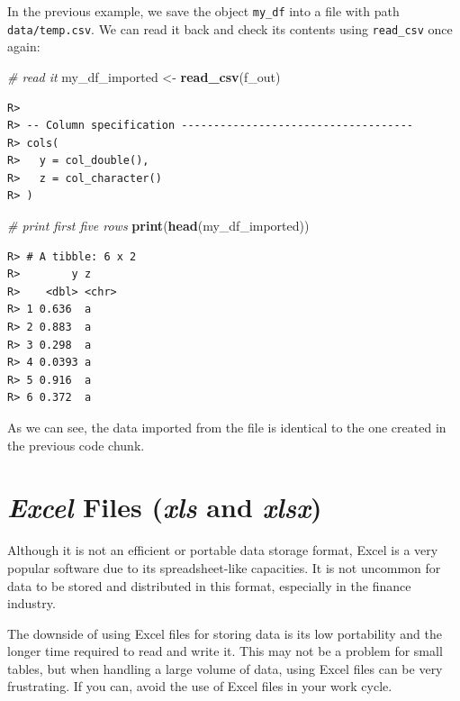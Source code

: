 \documentclass[
  12pt,
]{book}
\newenvironment{Shaded}{\begin{snugshade}}{\end{snugshade}}
\newcommand{\CommentTok}[1]{\textcolor[rgb]{0.37,0.37,0.37}{\textit{#1}}}
\newcommand{\KeywordTok}[1]{\textcolor[rgb]{0.27,0.27,0.27}{\textbf{#1}}}
\newcommand{\NormalTok}[1]{#1}
\newcommand{\StringTok}[1]{\textcolor[rgb]{0.5,0.5,0.5}{#1}}
\begin{document}
In the previous example, we save the object \texttt{my\_df} into a file with path \texttt{data/temp.csv}. We can read it back and check its contents using \texttt{read\_csv} once again:

\begin{Shaded}
\begin{Highlighting}[]
\CommentTok{# read it}
\NormalTok{my_df_imported <-}\StringTok{ }\KeywordTok{read_csv}\NormalTok{(f_out)}
\end{Highlighting}
\end{Shaded}

\begin{verbatim}
R> 
R> -- Column specification ------------------------------------
R> cols(
R>   y = col_double(),
R>   z = col_character()
R> )
\end{verbatim}

\begin{Shaded}
\begin{Highlighting}[]
\CommentTok{# print first five rows}
\KeywordTok{print}\NormalTok{(}\KeywordTok{head}\NormalTok{(my_df_imported))}
\end{Highlighting}
\end{Shaded}

\begin{verbatim}
R> # A tibble: 6 x 2
R>        y z    
R>    <dbl> <chr>
R> 1 0.636  a    
R> 2 0.883  a    
R> 3 0.298  a    
R> 4 0.0393 a    
R> 5 0.916  a    
R> 6 0.372  a
\end{verbatim}

As we can see, the data imported from the file is identical to the one created in the previous code chunk.

\hypertarget{excel-files-xls-and-xlsx}{%
\section{\texorpdfstring{\emph{Excel} Files (\emph{xls} and \emph{xlsx})}{Excel Files (xls and xlsx)}}\label{excel-files-xls-and-xlsx}}

Although it is not an efficient or portable data storage format, Excel is a very popular software due to its spreadsheet-like capacities. It is not uncommon for data to be stored and distributed in this format, especially in the finance industry.

The downside of using Excel files for storing data is its low portability and the longer time required to read and write it. This may not be a problem for small tables, but when handling a large volume of data, using Excel files can be very frustrating. If you can, avoid the use of Excel files in your work cycle.
\end{document}
